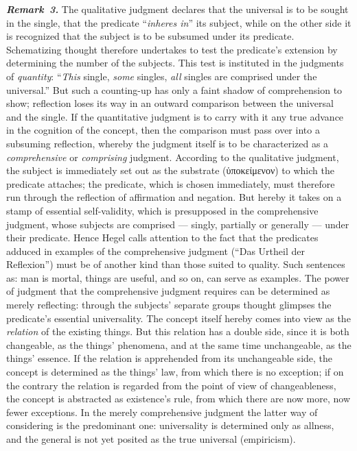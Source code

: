 \documentclass[12pt]{book}
\newcommand{\anm}[1]{\emph{\textbf{Remark~#1.}}}
\begin{document}
\anm{3} The qualitative judgment declares that the universal is to be sought
in the single, that the predicate ``\emph{inheres in}'' its subject, while
on the other side it is recognized that the subject is to be subsumed under
its predicate. Schematizing thought therefore undertakes to test the
predicate's extension by determining the number of the subjects. This test
is instituted in the judgments of \emph{quantity}: ``\emph{This} single,
\emph{some} singles, \emph{all} singles are comprised under the
universal.'' But such a counting-up has only a faint shadow of comprehension
to show; reflection loses its way in an outward comparison between the
universal and the single. If the quantitative judgment is to carry with it
any true advance in the cognition of the concept, then the comparison must
pass over into a subsuming reflection, whereby the judgment itself is to be
characterized as a \emph{comprehensive} or \emph{comprising} judgment.
According to the qualitative judgment, the subject is immediately set out as
the substrate (ὑποκείμενον) to which the predicate attaches; the predicate,
which is chosen immediately, must therefore run through the reflection of
affirmation and negation. But hereby it takes on a stamp of essential
self-validity, which is presupposed in the comprehensive judgment, whose
subjects are comprised --- singly, partially or generally --- under their
predicate. Hence Hegel calls attention to the fact that the predicates
adduced in examples of the comprehensive judgment (``Das Urtheil der
Reflexion'') must be of another kind than those suited to quality. Such
sentences as: man is mortal, things are useful, and so on, can serve as
examples. The power of judgment that the comprehensive judgment requires can
be determined as merely reflecting: through the subjects' separate groups
thought glimpses the predicate's essential universality. The concept itself
hereby comes into view as the \emph{relation} of the existing things. But
this relation has a double side, since it is both changeable, as the things'
phenomena, and at the same time unchangeable, as the things' essence. If the
relation is apprehended from its unchangeable side, the concept is
determined as the things' law, from which there is no exception; if on the
contrary the relation is regarded from the point of view of changeableness,
the concept is abstracted as existence's rule, from which there are now
more, now fewer exceptions. In the merely comprehensive judgment the latter
way of considering is the predominant one: universality is determined only
as allness, and the general is not yet posited as the true universal
(empiricism).
\end{document}
